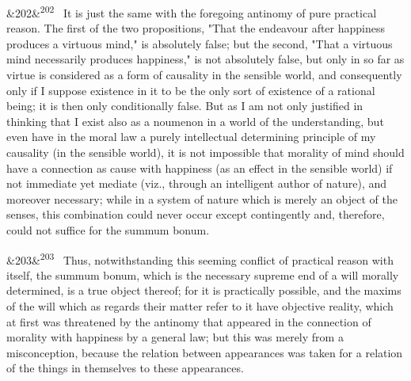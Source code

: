 \documentclass[12pt]{article}
\newcommand{\para}[1][]{\par\noindent\ifx&#1&\else\textsuperscript{\footnotesize #1}~\fi}
\begin{document}
\para[202] It is just the same with the foregoing antinomy of pure practical reason. The first of the two propositions, "That the endeavour after happiness produces a virtuous mind," is absolutely false; but the second, "That a virtuous mind necessarily produces happiness," is not absolutely false, but only in so far as virtue is considered as a form of causality in the sensible world, and consequently only if I suppose existence in it to be the only sort of existence of a rational being; it is then only conditionally false. But as I am not only justified in thinking that I exist also as a noumenon in a world of the understanding, but even have in the moral law a purely intellectual determining principle of my causality (in the sensible world), it is not impossible that morality of mind should have a connection as cause with happiness (as an effect in the sensible world) if not immediate yet mediate (viz., through an intelligent author of nature), and moreover necessary; while in a system of nature which is merely an object of the senses, this combination could never occur except contingently and, therefore, could not suffice for the summum bonum.

\para[203] Thus, notwithstanding this seeming conflict of practical reason with itself, the summum bonum, which is the necessary supreme end of a will morally determined, is a true object thereof; for it is practically possible, and the maxims of the will which as regards their matter refer to it have objective reality, which at first was threatened by the antinomy that appeared in the connection of morality with happiness by a general law; but this was merely from a misconception, because the relation between appearances was taken for a relation of the things in themselves to these appearances.
\end{document}
